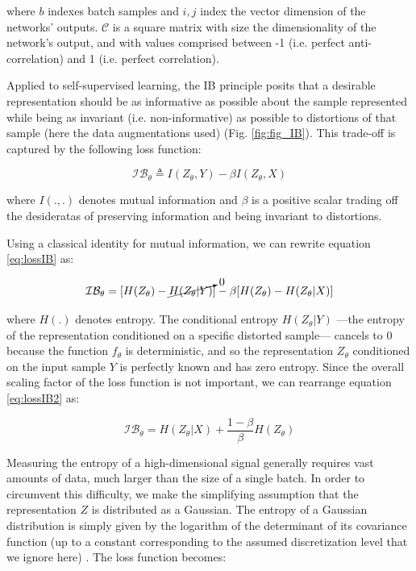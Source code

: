 where $b$ indexes batch samples and $i,j$ index the vector dimension of the networks' outputs. $\mathcal{C}$ is a square matrix with size the dimensionality of the network's output, and with values comprised between -1 (i.e. perfect anti-correlation) and 1 (i.e. perfect correlation). 

Applied to self-supervised learning, the IB principle posits that a desirable representation should be as informative as possible about the sample represented while being as invariant (i.e. non-informative) as possible to distortions of that sample (here the data augmentations used) (Fig. \ref{fig:fig_IB}). This trade-off is captured by the following loss function:

\begin{equation}
   \mathcal{IB_{ \theta}} \triangleq I(Z_{\theta}, Y) - \beta I(Z_{\theta}, X)
    \label{eq:lossIB}
\end{equation}

where $I(.,.)$ denotes mutual information and $\beta$ is a positive scalar trading off the desideratas of preserving information and being invariant to distortions.

Using a classical identity for mutual information, we can rewrite equation \ref{eq:lossIB} as:

\begin{equation}
   \mathcal{IB_{ \theta}} = [H(Z_{\theta}) - \cancelto{0}{H(Z_{\theta}|Y)}] - \beta [H(Z_{\theta}) - H(Z_{\theta}|X)] 
    \label{eq:lossIB2}
\end{equation}

where $H(.)$ denotes entropy. The conditional entropy $H(Z_{\theta}|Y)$ ---the entropy of the representation conditioned on a specific distorted sample--- cancels to 0 because the function $f_{\theta}$ is deterministic, and so the representation $Z_{\theta}$ conditioned on the input sample $Y$ is perfectly known and has zero entropy. Since the overall scaling factor of the loss function is not important, we can rearrange equation \ref{eq:lossIB2} as: 

\begin{equation}
   \mathcal{IB_{ \theta}} =  H(Z_{\theta}|X) + \frac{1-\beta}{\beta}  H(Z_{\theta})
    \label{eq:lossIB3}
\end{equation}

Measuring the entropy of a high-dimensional signal generally requires vast amounts of data, much larger than the size of a single batch. In order to circumvent this difficulty, we make the simplifying assumption that the representation $Z$ is distributed as a Gaussian. The entropy of a Gaussian distribution is simply given by the logarithm of the determinant of its covariance function (up to a constant corresponding to the assumed discretization level that we ignore here) \cite{cai_law_2015}. The loss function becomes:  

